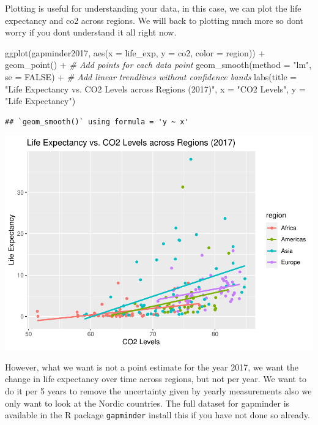 \documentclass[
]{book}
\newenvironment{Shaded}{\begin{snugshade}}{\end{snugshade}}
\newcommand{\AttributeTok}[1]{\textcolor[rgb]{0.77,0.63,0.00}{#1}}
\newcommand{\CommentTok}[1]{\textcolor[rgb]{0.56,0.35,0.01}{\textit{#1}}}
\newcommand{\ConstantTok}[1]{\textcolor[rgb]{0.00,0.00,0.00}{#1}}
\newcommand{\FunctionTok}[1]{\textcolor[rgb]{0.00,0.00,0.00}{#1}}
\newcommand{\NormalTok}[1]{#1}
\newcommand{\SpecialCharTok}[1]{\textcolor[rgb]{0.00,0.00,0.00}{#1}}
\newcommand{\StringTok}[1]{\textcolor[rgb]{0.31,0.60,0.02}{#1}}
\begin{document}
Plotting is useful for understanding your data, in this case, we can
plot the life expectancy and co2 across regions. We will back to
plotting much more so dont worry if you dont understand it all right
now.

\begin{Shaded}
\begin{Highlighting}[]
\FunctionTok{ggplot}\NormalTok{(gapminder2017, }\FunctionTok{aes}\NormalTok{(}\AttributeTok{x =}\NormalTok{ life\_exp, }\AttributeTok{y =}\NormalTok{ co2, }\AttributeTok{color =}\NormalTok{ region)) }\SpecialCharTok{+}
  \FunctionTok{geom\_point}\NormalTok{() }\SpecialCharTok{+}  \CommentTok{\# Add points for each data point}
  \FunctionTok{geom\_smooth}\NormalTok{(}\AttributeTok{method =} \StringTok{"lm"}\NormalTok{, }\AttributeTok{se =} \ConstantTok{FALSE}\NormalTok{) }\SpecialCharTok{+}  \CommentTok{\# Add linear trendlines without confidence bands}
  \FunctionTok{labs}\NormalTok{(}\AttributeTok{title =} \StringTok{"Life Expectancy vs. CO2 Levels across Regions (2017)"}\NormalTok{, }\AttributeTok{x =} \StringTok{"CO2 Levels"}\NormalTok{, }\AttributeTok{y =} \StringTok{"Life Expectancy"}\NormalTok{)}
\end{Highlighting}
\end{Shaded}

\begin{verbatim}
## `geom_smooth()` using formula = 'y ~ x'
\end{verbatim}

\includegraphics{data_files/figure-latex/unnamed-chunk-20-1.pdf}

However, what we want is not a point estimate for the year 2017, we want
the change in life expectancy over time across regions, but not per
year. We want to do it per 5 years to remove the uncertainty given by
yearly measurements also we only want to look at the Nordic countries.
The full dataset for gapminder is available in the R package
\texttt{gapminder} install this if you have not done so already.
\end{document}
